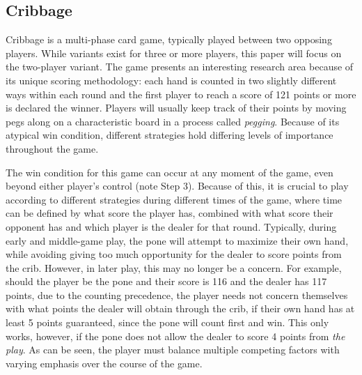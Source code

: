 

\subsection{Cribbage}

Cribbage is a multi-phase card game, typically played between two opposing
players.
%
While variants exist for three or more players, this paper will focus on the
two-player variant.
%
The game presents an interesting research area because of its unique scoring
methodology:
each hand is counted in two slightly different ways within each round and the
first player to reach a score of 121 points or more is declared the winner.
%
Players will usually keep track of their points by moving pegs along on a 
characteristic board
in a process called \textit{pegging}.
%
Because of its atypical win condition, different strategies hold differing
levels of importance throughout the game.




The win condition for this game can occur at any moment of the game,
even beyond either player's control (note Step 3).
%
Because of this,
it is crucial to play according to different strategies during
different times of the game,
where time can be defined by what score the player has,
combined with what score their opponent has
and which player is the dealer for that round.
%
Typically, during early and middle-game play,
the pone will attempt to maximize their own hand,
while avoiding giving too much opportunity for the dealer to score points from
the crib.
%
However, in later play, this may no longer be a concern.
%
For example, should the player be the pone and their score is 116
and the dealer has 117 points,
due to the counting precedence,
the player needs not concern themselves with what points the dealer will obtain
through the crib, if their own hand has at least 5 points guaranteed,
since the pone will count first and win.
%
This only works, however, if the pone does not allow the dealer to score 4
points from \textit{the play}.
%
As can be seen, the player must balance multiple competing factors with varying
emphasis over the course of the game.

%	


